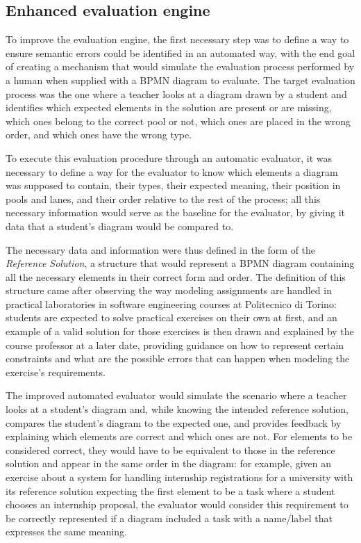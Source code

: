 \subsection{Enhanced evaluation engine}

To improve the evaluation engine, the first necessary step was to define a way to ensure semantic errors could be identified in an automated way, with the end goal of creating a mechanism that would simulate the evaluation process performed by a human when supplied with a BPMN diagram to evaluate. The target evaluation process was the one where a teacher looks at a diagram drawn by a student and identifies which expected elements in the solution are present or are missing, which ones belong to the correct pool or not, which ones are placed in the wrong order, and which ones have the wrong type. 

To execute this evaluation procedure through an automatic evaluator, it was necessary to define a way for the evaluator to know which elements a diagram was supposed to contain, their types, their expected meaning, their position in pools and lanes, and their order relative to the rest of the process; all this necessary information would serve as the baseline for the evaluator, by giving it data that a student's diagram would be compared to. 

The necessary data and information were thus defined in the form of the \textit{Reference Solution}, a structure that would represent a BPMN diagram containing all the necessary elements in their correct form and order. The definition of this structure came after observing the way modeling assignments are handled in practical laboratories in software engineering courses at Politecnico di Torino: students are expected to solve practical exercises on their own at first, and an example of a valid solution for those exercises is then drawn and explained by the course professor at a later date, providing guidance on how to represent certain constraints and what are the possible errors that can happen when modeling the exercise's requirements.

The improved automated evaluator would simulate the scenario where a teacher looks at a student's diagram and, while knowing the intended reference solution, compares the student's diagram to the expected one, and provides feedback by explaining which elements are correct and which ones are not. For elements to be considered correct, they would have to be equivalent to those in the reference solution and appear in the same order in the diagram: for example, given an exercise about a system for handling internship registrations for a university with its reference solution expecting the first element to be a task where a student chooses an internship proposal, the evaluator would consider this requirement to be correctly represented if a diagram included a task with a name/label that expresses the same meaning.

